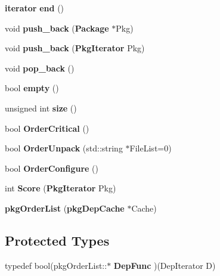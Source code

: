 \begin{DoxyCompactItemize}
\item 
{\bf iterator} {\bfseries end} ()\label{classpkgOrderList_acad38d52497a975bfb6f2f6acd76631f}

\item 
void {\bfseries push\-\_\-back} ({\bf \-Package} $\ast$\-Pkg)\label{classpkgOrderList_a7bbf77a70da924bfd05266573ddb39e0}

\item 
void {\bfseries push\-\_\-back} ({\bf \-Pkg\-Iterator} \-Pkg)\label{classpkgOrderList_a4777f2cc85762ee96b3cc55f42cece94}

\item 
void {\bfseries pop\-\_\-back} ()\label{classpkgOrderList_a058bda4957df6a97b1ea6c9fd783f672}

\item 
bool {\bfseries empty} ()\label{classpkgOrderList_a3f37b042a1e7cd4bd38fc564de81f0da}

\item 
unsigned int {\bfseries size} ()\label{classpkgOrderList_a7033bafa80d2349b9b0da59d8c486767}

\item 
bool {\bfseries \-Order\-Critical} ()\label{classpkgOrderList_a031c8f8b743a5450a96d70a270ae41d2}

\item 
bool {\bfseries \-Order\-Unpack} (std\-::string $\ast$\-File\-List=0)\label{classpkgOrderList_a9ebaf3e9000fc0714d0e9d0137251ef2}

\item 
bool {\bfseries \-Order\-Configure} ()\label{classpkgOrderList_ad599f3c1cd70feea6a35067bd37b53ff}

\item 
int {\bfseries \-Score} ({\bf \-Pkg\-Iterator} \-Pkg)\label{classpkgOrderList_ab76423036627f56588d837c45d02ffe6}

\item 
{\bfseries pkg\-Order\-List} ({\bf pkg\-Dep\-Cache} $\ast$\-Cache)\label{classpkgOrderList_ad154ef3e20c5c40e51bc9b34aff786f3}

\end{DoxyCompactItemize}
\subsection*{\-Protected \-Types}
\begin{DoxyCompactItemize}
\item 
typedef bool(pkg\-Order\-List\-::$\ast$ {\bfseries \-Dep\-Func} )(\-Dep\-Iterator \-D)\label{classpkgOrderList_a9b41abab82af8c7466e99979833faca1}

\end{DoxyCompactItemize}

